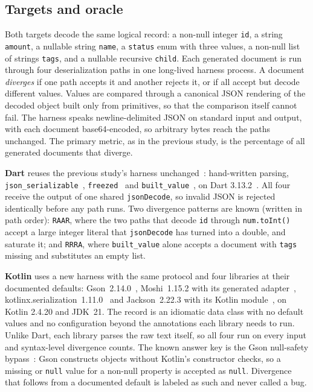 \subsection{Targets and oracle}

Both targets decode the same logical record: a non-null integer
\texttt{id}, a string \texttt{amount}, a nullable string \texttt{name}, a
\texttt{status} enum with three values, a non-null list of strings
\texttt{tags}, and a nullable recursive \texttt{child}. Each generated
document is run through four deserialization paths in one
long-lived harness process. A document \emph{diverges} if one path accepts
it and another rejects it, or if all accept but decode different values.
Values are compared through a canonical JSON rendering of the decoded
object built only from primitives, so that the comparison itself cannot
fail. The harness speaks newline-delimited JSON on standard input and output,
with each document base64-encoded, so arbitrary bytes reach the paths
unchanged. The primary metric, as in the previous study, is the percentage
of all generated documents that diverge.

\textbf{Dart} reuses the previous study's harness unchanged~\dartcite: hand-written
parsing, \texttt{json\_serializable}~\cite{jsonserializable2026},
\texttt{freezed}~\cite{freezed2026} and
\texttt{built\_value}~\cite{builtvalue2026}, on Dart
3.13.2~\cite{dart2026lang}. All four receive the output of one shared
\texttt{jsonDecode}, so invalid JSON is rejected identically before any
path runs. Two divergence patterns are known (written in path order):
\texttt{RAAR}, where the two paths that decode \texttt{id} through
\texttt{num.toInt()} accept a large integer literal that
\texttt{jsonDecode} has turned into a double, and saturate it; and
\texttt{RRRA}, where \texttt{built\_value} alone accepts a document with
\texttt{tags} missing and substitutes an empty list.

\textbf{Kotlin} uses a new harness with the same protocol and four libraries
at their documented defaults: Gson~2.14.0~\cite{gson2026},
Moshi~1.15.2 with its generated adapter~\cite{moshi2026},
kotlinx.serialization~1.11.0~\cite{kotlinxserialization2026} and
Jackson~2.22.3 with its Kotlin module~\cite{jacksonkotlin2026}, on Kotlin
2.4.20 and JDK~21. The record is an idiomatic data
class with no default values and no configuration beyond the annotations each
library needs to run. Unlike Dart, each library parses the raw text itself,
so all four run on every input and syntax-level divergence counts. The known
answer key is the Gson null-safety bypass~\cite{gsonissue1657}: Gson
constructs objects without Kotlin's constructor checks, so a missing or
\texttt{null} value for a non-null property is accepted as \texttt{null}.
Divergence that follows from a documented default is labeled as such and
never called a bug.

